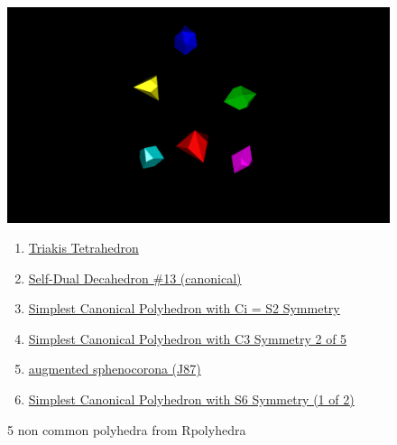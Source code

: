 \documentclass[a4paper,10pt]{article}
\begin{document}
\begin{figure}
 \begin{center}
    \includegraphics[width=15cm]{images/rpolyhedra_ic18_workshop.png}
 \end{center}
\caption{5 non common polyhedra from Rpolyhedra}
\begin{enumerate}
\item \href{https://qbotics.shinyapps.io/rpolyhedra-explorer/?%
}{Triakis Tetrahedron}

\item \href{https://qbotics.shinyapps.io/rpolyhedra-explorer/?_inputs_&polyhedron_color=%
}{Self-Dual Decahedron \#13 (canonical)}
\item \href{https://qbotics.shinyapps.io/rpolyhedra-explorer/?_inputs_&polyhedron_color=%
}{Simplest Canonical Polyhedron with Ci = S2 Symmetry}




\item \href{
https://qbotics.shinyapps.io/rpolyhedra-explorer/?_inputs_&polyhedron_color=%
}{Simplest Canonical Polyhedron with C3 Symmetry 2 of 5}
\item \href{
https://qbotics.shinyapps.io/rpolyhedra-explorer/?_inputs_&polyhedron_color=%
\item \href{
https://qbotics.shinyapps.io/rpolyhedra-explorer/?_inputs_&polyhedron_color=%
}{Simplest Canonical Polyhedron with S6 Symmetry (1 of 2)}
\end{enumerate}
\end{figure}
\end{document}
